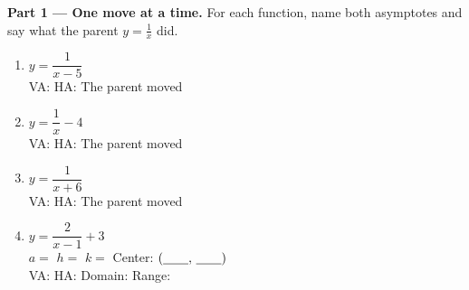 \documentclass[10pt]{article}
\begin{document}
\begin{tcolorbox}[colback=white, colframe=black!40, title=\textbf{Tier R --- Remediate},
    fonttitle=\bfseries, arc=1.5mm, left=3mm, right=3mm, top=2mm, bottom=2mm, breakable]
\textbf{Part 1 --- One move at a time.} For each function, name both asymptotes and say what the parent
$y=\frac1x$ did.
\begin{enumerate}[leftmargin=1.9em, itemsep=8pt]
  \item $y=\dfrac{1}{x-5}$ \\[3pt]
        VA: \blank{1.4cm} \quad HA: \blank{1.4cm} \quad The parent moved \blank{3.0cm}
  \item $y=\dfrac{1}{x}-4$ \\[3pt]
        VA: \blank{1.4cm} \quad HA: \blank{1.4cm} \quad The parent moved \blank{3.0cm}
  \item $y=\dfrac{1}{x+6}$ \\[3pt]
        VA: \blank{1.4cm} \quad HA: \blank{1.4cm} \quad The parent moved \blank{3.0cm}
  \item $y=\dfrac{2}{x-1}+3$ \\[3pt]
        $a=$ \blank{0.8cm} \quad $h=$ \blank{0.8cm} \quad $k=$ \blank{0.8cm} \quad
        Center: $(\blank{0.7cm},\,\blank{0.7cm})$ \\[3pt]
        VA: \blank{1.4cm} \quad HA: \blank{1.4cm} \quad Domain: \blank{2.0cm} \quad
        Range: \blank{2.0cm}
\end{enumerate}


\end{tcolorbox}
\end{document}
